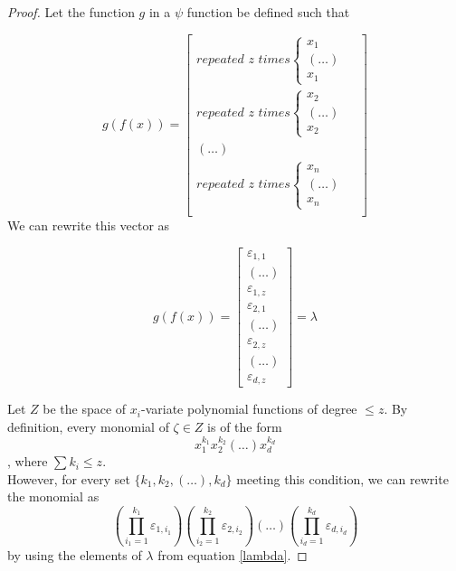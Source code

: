 \documentclass{article}
\theoremstyle{definition}
\theoremstyle{definition}
\begin{document}
\begin{proof}
Let the function $g$ in a $\psi$ function be defined such that

\begin{equation}
    g(f(x))
    = 
    \begin{bmatrix}
        \textit{repeated $z$ times} 
        \begin{cases}
            x_1 &  \\
            (\dots) & \\
            x_1 & 
        \end{cases} \\
        \textit{repeated $z$ times} 

        \begin{cases}
            x_2 &  \\
            (\dots) & \\
            x_2 & 
        \end{cases} \\
        (\dots) \\
        \textit{repeated $z$ times} 
        \begin{cases}
            x_n &  \\
            (\dots) & \\
            x_n & 
        \end{cases} \\
    \end{bmatrix}
\end{equation}
We can rewrite this vector as 

\begin{equation} \label{lambda}
    g(f(x))
    = 
    \begin{bmatrix}
        \varepsilon_{1, 1} \\
        (\dots) \\
        \varepsilon_{1, z} \\
        \varepsilon_{2, 1} \\
        (\dots) \\
        \varepsilon_{2, z} \\
        (\dots) \\
        \varepsilon_{d, z} 
    \end{bmatrix}
    = \lambda
\end{equation}

Let $Z$ be the space of $x_i$-variate polynomial functions 
of degree $\leq z$. By definition, every monomial of $\zeta \in Z$ is of the form
\begin{equation}
    x_{1}^{k_1}x_{2}^{k_2}(\dots)x_{d}^{k_d}
\end{equation}
, where $\sum k_i \leq z$. \\
However, for every set $\{k_1, k_2, (\dots), k_d\}$ meeting this condition,
we can rewrite the monomial as
\begin{equation}
    \left( \prod_{i_1=1}^{k_1}\varepsilon_{1, i_1} \right)
    \left( \prod_{i_2=1}^{k_2}\varepsilon_{2, i_2} \right)
    \left( \dots \right)
    \left( \prod_{i_d=1}^{k_d}\varepsilon_{d, i_d} \right)
\end{equation}
by using the elements of $\lambda$ from equation \eqref{lambda}.


\end{proof}
\end{document}
